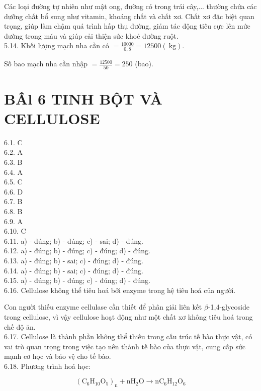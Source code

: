 \documentclass[10pt]{article}
\begin{document}
Các loại đường tự nhiên như mật ong, đường có trong trái cây,... thường chứa các dưỡng chất bổ sung như vitamin, khoáng chất và chất xơ. Chất xơ đặc biệt quan trọng, giúp làm chậm quá trình hấp thụ đường, giảm tác động tiêu cực lên mức đường trong máu và giúp cải thiện sức khoẻ đường ruột.\\
5.14. Khối lượng mạch nha cần có $=\frac{10000}{0,8}=12500(\mathrm{~kg})$.

Số bao mạch nha cần nhập $=\frac{12500}{50}=250$ (bao).

\section*{BÂl 6 TINH BỘT VÀ CELLULOSE}
6.1. C\\
6.2. A\\
6.3. B\\
6.4. A\\
6.5. C\\
6.6. D\\
6.7. B\\
6.8. B\\
6.9. A\\
6.10. C\\
6.11. a) - đúng; b) - đúng; c) - sai; d) - đúng.\\
6.12. a) - đúng; b) - đúng; c) - đúng; d) - đúng.\\
6.13. a) - đúng; b) - sai; c) - đúng; d) - đúng.\\
6.14. a) - đúng; b) - sai; c) - đúng; d) - đúng.\\
6.15. a) - đúng; b) - đúng; c) - đúng; d) - đúng.\\
6.16. Cellulose không thể tiêu hoá bởi enzyme trong hệ tiêu hoá của người.

Con người thiếu enzyme cellulase cần thiết để phân giải liên kết $\beta$-1,4-glycoside trong cellulose, vì vậy cellulose hoạt động như một chất xơ không tiêu hoá trong chế độ ăn.\\
6.17. Cellulose là thành phần không thể thiếu trong cấu trúc tế bào thực vật, có vai trò quan trọng trong việc tạo nên thành tế bào của thực vật, cung cấp sức mạnh cơ học và bảo vệ cho tế bào.\\
6.18. Phương trình hoá học:

$$
\left(\mathrm{C}_{6} \mathrm{H}_{10} \mathrm{O}_{5}\right)_{\mathrm{n}}+\mathrm{nH}_{2} \mathrm{O} \rightarrow \mathrm{nC}_{6} \mathrm{H}_{12} \mathrm{O}_{6}
$$
\end{document}
